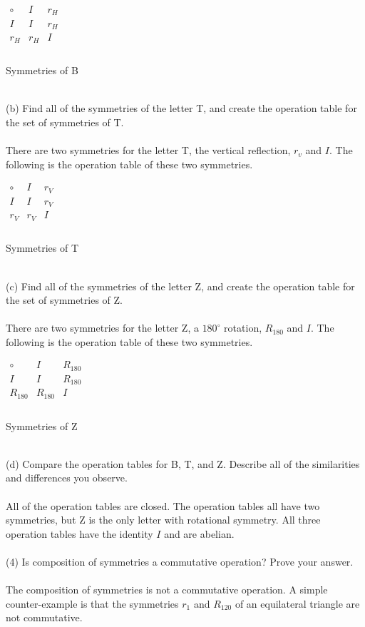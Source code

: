 \documentclass[11pt,a4paper]{article}
\begin{document}
\begin{center}
$
\begin{array}{c|c|c}
\circ & I & r_H \\\hline
I & I & r_H \\\hline
r_H & r_H & I \\
\end{array}
$\\
~\\
Symmetries of B
\end{center}
~\\
(b) Find all of the symmetries of the letter T, and create the operation table
for the set of symmetries of T.\\
~\\
There are two symmetries for the letter T, the vertical reflection, $r_v$ and $I$. The following is the operation table of these two symmetries.\\
\begin{center}
$
\begin{array}{c|c|c}
\circ & I & r_V \\\hline
I & I & r_V \\\hline
r_V & r_V & I \\
\end{array}
$\\
~\\
Symmetries of T
\end{center}
~\\
(c) Find all of the symmetries of the letter Z, and create the operation table
for the set of symmetries of Z.\\
~\\
There are two symmetries for the letter Z, a $180^\circ$ rotation, $R_{180}$ and $I$. The following is the operation table of these two symmetries.\\
\begin{center}
$
\begin{array}{c|c|c}
\circ & I & R_{180} \\\hline
I & I & R_{180} \\\hline
R_{180} & R_{180} & I \\
\end{array}
$\\
~\\
Symmetries of Z
\end{center}
~\\
(d) Compare the operation tables for B, T, and Z. Describe all of the similarities and differences you observe.\\
~\\
All of the operation tables are closed. The operation tables all have two symmetries, but Z is the only letter with rotational symmetry. All three operation tables have the identity $I$ and are abelian.\\
~\\
(4) Is composition of symmetries a commutative operation? Prove your answer.\\
~\\
The composition of symmetries is not a commutative operation. A simple counter-example is that the symmetries $r_1$ and $R_{120}$ of an equilateral triangle are not commutative.\\
\end{document}
